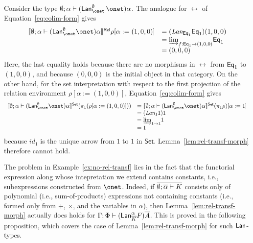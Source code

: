 \documentclass{lmcs}
\theoremstyle{plain}\newtheorem{satz}[thm]{Satz}
\newcommand{\set}{\mathsf{Set}}
\renewcommand{\id}{\mathit{id}}
\begin{document}
\begin{exa}\label{ex:no-rel-transf}
Consider the type $\emptyset; \alpha \vdash
(\Lan^{\emptyset}_{\onet}\, \onet) \alpha$. The analogue for $\rel$ of
Equation~\ref{eq:colim-form} gives
\[
\begin{array}{rl}
\relsem{ \emptyset; \alpha \vdash (\Lan^{\emptyset}_{\onet} \onet)
  \alpha } \rho [\alpha := (1, 0, 0)] 
&= (\textit{Lan}_{\Eq_1} \Eq_1)(1, 0, 0) \\
&= \colim{f : \Eq_1 \to (1, 0, 0)}{\Eq_1} \\
&= (0, 0, 0)
\end{array}
\]
Here, the last equality holds because there are no morphisms in $\rel$
from $\mathsf{Eq}_1$ to $(1, 0, 0)$, and because $(0,0,0)$ is the initial
object in that category. On the other hand, for the set interpretation
with respect to the first projection of the relation environment
$\rho[\alpha := (1,0,0)]$, Equation~\ref{eq:colim-form} gives
\[
\begin{array}{rl}
\setsem{ \emptyset; \alpha \vdash (\Lan^{\emptyset}_{\onet} \onet)
  \alpha } ( \pi_1 ( \rho [\alpha := (1, 0, 0)] ) ) 
&= \setsem{ \emptyset; \alpha \vdash (\Lan^{\emptyset}_{\onet} \onet)
  \alpha } (\pi_1 \rho) [\alpha := 1] \\ 
&= (\textit{Lan}_{1} 1) 1 \\
&= \colim{1 \to 1}{1} \\
&= 1
\end{array}
\]
because $\id_1$ is the unique arrow from $1$ to $1$ in $\set$.
Lemma~\ref{lem:rel-transf-morph} therefore cannot hold.
\end{exa}

The problem in Example~\ref{ex:no-rel-transf} lies in the fact that
the {\color{red} functorial expression} along whose intepretation we
extend contains constants, i.e., {\color{red} subexpressions}
constructed from $\onet$. Indeed, if $\overline{\emptyset; \overline{\alpha}
  \vdash K}$ consists only of polynomial (i.e., sum-of-products)
expressions not containing constants (i.e., formed only from $+$,
$\times$, and the variables in $\alpha$), then
Lemma~\ref{lem:rel-transf-morph} actually does holds for $\Gamma; \Phi
\vdash (\mathsf{Lan}^{\alpha}_{\overline{K}} F)\overline{A}$. This is proved in the
following proposition, which covers the case of
Lemma~\ref{lem:rel-transf-morph} for such $\mathsf{Lan}$-types.
\end{document}
